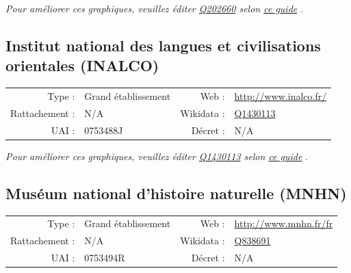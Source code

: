 \documentclass[11pt,french,landscape]{article}
\begin{document}
\textit{\scriptsize Pour améliorer ces graphiques, veuillez éditer \href{https://www.wikidata.org/entity/Q202660}{Q202660}  selon \href{https://github.com/cpesr/wikidataESR/blob/master/Rmd/wikidataESR.md}{ce guide}}
.


\newpage

\hypertarget{institut-national-des-langues-et-civilisations-orientales-inalco}{%
\subsection{Institut national des langues et civilisations orientales
(INALCO)}\label{institut-national-des-langues-et-civilisations-orientales-inalco}}

\begin{tabular*}{0.45\textwidth}{rp{2cm}rl}  
\hline  
Type : & Grand établissement & Web : &\href{http://www.inalco.fr/}{http://www.inalco.fr/} \\  
Rattachement : & N/A & Wikidata : & \href{https://www.wikidata.org/entity/Q1430113}{Q1430113} \\  
UAI : & 0753488J & Décret : & N/A \\  
\hline  
\end{tabular*}

\textit{\scriptsize Pour améliorer ces graphiques, veuillez éditer \href{https://www.wikidata.org/entity/Q1430113}{Q1430113}  selon \href{https://github.com/cpesr/wikidataESR/blob/master/Rmd/wikidataESR.md}{ce guide}}
.


\newpage

\hypertarget{musuxe9um-national-dhistoire-naturelle-mnhn}{%
\subsection{Muséum national d'histoire naturelle
(MNHN)}\label{musuxe9um-national-dhistoire-naturelle-mnhn}}

\begin{tabular*}{0.45\textwidth}{rp{2cm}rl}  
\hline  
Type : & Grand établissement & Web : &\href{http://www.mnhn.fr/fr}{http://www.mnhn.fr/fr} \\  
Rattachement : & N/A & Wikidata : & \href{https://www.wikidata.org/entity/Q838691}{Q838691} \\  
UAI : & 0753494R & Décret : & N/A \\  
\hline  
\end{tabular*}
\end{document}
